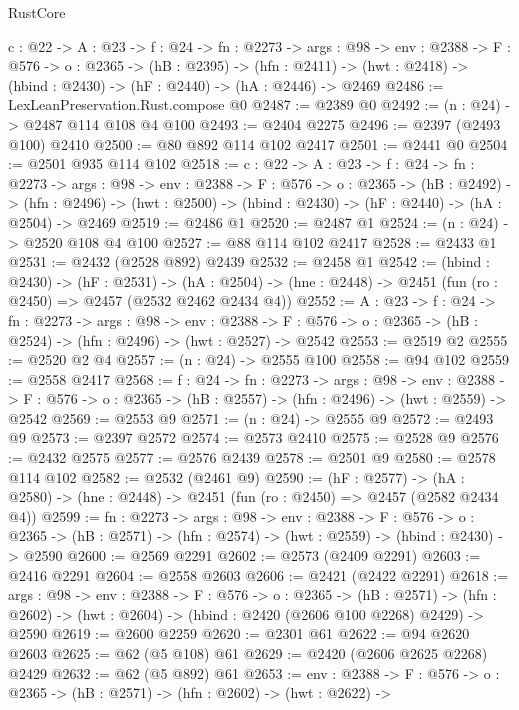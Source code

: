 \begin{lexlean}{RustCore}
\begin{coremodule}
  {c : @22} ->
  {A : @23} ->
  {f : @24} ->
  {fn : @2273} ->
  {args : @98} ->
  {env : @2388} ->
  {F : @576} ->
  {o : @2365} ->
  (hB : @2395) ->
  (hfn : @2411) -> (hwt : @2418) -> (hbind : @2430) -> (hF : @2440) -> (hA : @2446) -> @2469
@2486 := LexLeanPreservation.Rust.compose @0
@2487 := @2389 @0
@2492 := (n : @24) -> @2487 @114 @108 @4 @100
@2493 := @2404 @2275
@2496 := @2397 (@2493 @100) @2410
@2500 := @80 @892 @114 @102 @2417
@2501 := @2441 @0
@2504 := @2501 @935 @114 @102
@2518 := {c : @22} ->
  {A : @23} ->
  {f : @24} ->
  {fn : @2273} ->
  {args : @98} ->
  {env : @2388} ->
  {F : @576} ->
  {o : @2365} ->
  (hB : @2492) ->
  (hfn : @2496) -> (hwt : @2500) -> (hbind : @2430) -> (hF : @2440) -> (hA : @2504) -> @2469
@2519 := @2486 @1
@2520 := @2487 @1
@2524 := (n : @24) -> @2520 @108 @4 @100
@2527 := @88 @114 @102 @2417
@2528 := @2433 @1
@2531 := @2432 (@2528 @892) @2439
@2532 := @2458 @1
@2542 := (hbind : @2430) ->
  (hF : @2531) ->
  (hA : @2504) -> (hne : @2448) -> @2451 (fun (ro : @2450) => @2457 (@2532 @2462 @2434 @4))
@2552 := {A : @23} ->
  {f : @24} ->
  {fn : @2273} ->
  {args : @98} ->
  {env : @2388} ->
  {F : @576} -> {o : @2365} -> (hB : @2524) -> (hfn : @2496) -> (hwt : @2527) -> @2542
@2553 := @2519 @2
@2555 := @2520 @2 @4
@2557 := (n : @24) -> @2555 @100
@2558 := @94 @102
@2559 := @2558 @2417
@2568 := {f : @24} ->
  {fn : @2273} ->
  {args : @98} ->
  {env : @2388} ->
  {F : @576} -> {o : @2365} -> (hB : @2557) -> (hfn : @2496) -> (hwt : @2559) -> @2542
@2569 := @2553 @9
@2571 := (n : @24) -> @2555 @9
@2572 := @2493 @9
@2573 := @2397 @2572
@2574 := @2573 @2410
@2575 := @2528 @9
@2576 := @2432 @2575
@2577 := @2576 @2439
@2578 := @2501 @9
@2580 := @2578 @114 @102
@2582 := @2532 (@2461 @9)
@2590 := (hF : @2577) ->
  (hA : @2580) -> (hne : @2448) -> @2451 (fun (ro : @2450) => @2457 (@2582 @2434 @4))
@2599 := {fn : @2273} ->
  {args : @98} ->
  {env : @2388} ->
  {F : @576} ->
  {o : @2365} -> (hB : @2571) -> (hfn : @2574) -> (hwt : @2559) -> (hbind : @2430) -> @2590
@2600 := @2569 @2291
@2602 := @2573 (@2409 @2291)
@2603 := @2416 @2291
@2604 := @2558 @2603
@2606 := @2421 (@2422 @2291)
@2618 := {args : @98} ->
  {env : @2388} ->
  {F : @576} ->
  {o : @2365} ->
  (hB : @2571) ->
  (hfn : @2602) -> (hwt : @2604) -> (hbind : @2420 (@2606 @100 @2268) @2429) -> @2590
@2619 := @2600 @2259
@2620 := @2301 @61
@2622 := @94 @2620 @2603
@2625 := @62 (@5 @108) @61
@2629 := @2420 (@2606 @2625 @2268) @2429
@2632 := @62 (@5 @892) @61
@2653 := {env : @2388} ->
  {F : @576} ->
  {o : @2365} ->
  (hB : @2571) ->
  (hfn : @2602) ->
  (hwt : @2622) ->

\end{coremodule}
\end{lexlean}
